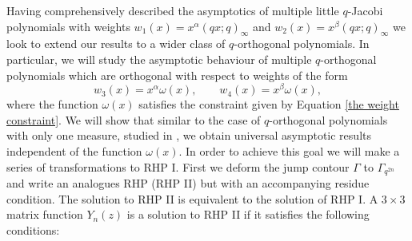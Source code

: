 \documentclass[a4paper,reqno]{amsart}
\numberwithin{equation}{section}
\numberwithin{figure}{section}
\begin{document}
Having comprehensively described the asymptotics of multiple little $q$-Jacobi polynomials with weights $w_1(x) = x^\alpha (qx;q)_\infty$ and $w_2(x) = x^\beta (qx;q)_\infty$ we look to extend our results to a wider class of $q$-orthogonal polynomials. In particular, we will study the asymptotic behaviour of multiple $q$-orthogonal polynomials which are orthogonal with respect to weights of the form
\begin{equation}\label{comparable weights}
    w_3(x) = x^\alpha\omega(x),\qquad w_4(x) = x^\beta\omega(x),
\end{equation}
where the function $\omega(x)$ satisfies the constraint given by Equation \eqref{the weight constraint}. We will show that similar to the case of $q$-orthogonal polynomials with only one measure, studied in \cite{NJTLconst}, we obtain universal asymptotic results independent of the function $\omega(x)$. In order to achieve this goal we will make a series of transformations to RHP I. First we deform the jump contour $\Gamma$ to $\Gamma_{q^{2n}}$ and write an analogues RHP (RHP II) but with an accompanying residue condition. The solution to RHP II is equivalent to the solution of RHP I.
A $3\times3$ matrix function $Y_n(z)$ is a solution to RHP II if it satisfies the following conditions:
\end{document}
